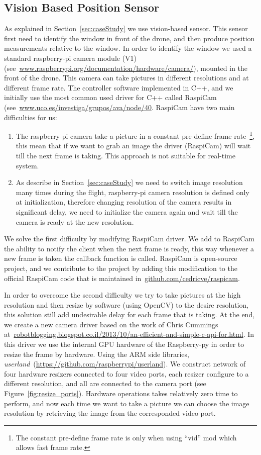 \documentclass[ twoside, 12pt ]{article}
\begin{document}
\subsection{Vision Based Position Sensor}
\label{sec:Experiment setup-cam}
As explained in Section~\ref{sec:caseStudy} we use vision-based sensor. This sensor first need to identify the window in front of the drone, and then produce position measurements relative to the window.
In order to identify the window we used a standard raspberry-pi camera module (V1) (see~\url{www.raspberrypi.org/documentation/hardware/camera/}), mounted in the front of the drone.
This camera can take pictures in different resolutions and at different frame rate.
The controller software implemented in C++, and we initially use the most common used driver for C++ called RaspiCam (see~\url{www.uco.es/investiga/grupos/ava/node/40}.
RaspiCam have two main difficulties for us:
\begin{enumerate}
    \item The raspberry-pi camera take a picture in a constant pre-define frame rate~\footnote{The constant pre-define frame rate is only when using ``vid'' mod which allows fast frame rate.}, this mean that if we want to grab an image the driver (RaspiCam) will wait till the next frame is taking. This approach is not suitable for real-time system.
    \item As describe in Section~\ref{sec:caseStudy} we need to switch image resolution many times during the flight, raspberry-pi camera resolution is defined only at initialization, therefore changing resolution of the camera results in significant delay, we need to initialize the camera again and wait till the camera is ready at the new resolution.
\end{enumerate} 

We solve the first difficulty by modifying RaspiCam driver. We add to RaspiCam the ability to notify the client when the next frame is ready, this way whenever a new frame is taken the callback function is called.
RaspiCam is open-source project, and we contribute to the project by adding this modification to the official RaspiCam code that is maintained in~\url{github.com/cedricve/raspicam}.

In order to overcome the second difficulty we try to take pictures at the high resolution and then resize by software (using OpenCV) to the desire resolution, this solution still add undesirable delay for each frame that is taking.
At the end, we create a new camera driver based on the work of Chris Cummings at~\url{robotblogging.blogspot.co.il/2013/10/an-efficient-and-simple-c-api-for.html}.
In this driver we use the internal GPU hardware of the Raspberry-py in order to resize the frame by hardware.
Using the ARM side libraries, \textit{userland}~(\url{https://github.com/raspberrypi/userland}). 
We construct network of four hardware resizers connected to four video ports, each resizer configure to a different resolution, and all are connected to the camera port (see Figure~\ref{fig:resize_ports}). 
Hardware operations takes relatively zero time to perform, and now each time we want to take a picture we can choose the image resolution by retrieving the image from the corresponded video port.
\end{document}
